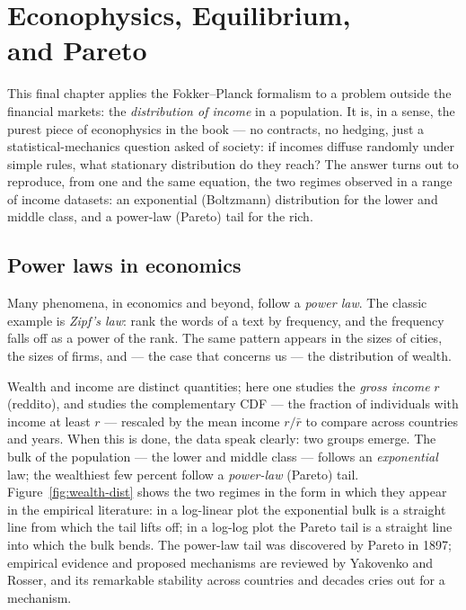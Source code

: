 
\chapter[Econophysics, Equilibrium, and Pareto]
{Econophysics, Equilibrium,\\and Pareto}

This final chapter applies the Fokker--Planck formalism to a problem outside the financial markets: the \emph{distribution of income} in a population.
It is, in a sense, the purest piece of econophysics in the book --- no contracts, no hedging, just a statistical-mechanics question asked of society: if incomes diffuse randomly under simple rules, what stationary distribution do they reach?
The answer turns out to reproduce, from one and the same equation, the two regimes observed in a range of income datasets: an exponential (Boltzmann) distribution for the lower and middle class, and a power-law (Pareto) tail for the rich.


\section{Power laws in economics}

Many phenomena, in economics and beyond, follow a \emph{power law}.
The classic example is \emph{Zipf's law}: rank the words of a text by frequency, and the frequency falls off as a power of the rank.
The same pattern appears in the sizes of cities, the sizes of firms, and --- the case that concerns us --- the distribution of wealth.

Wealth and income are distinct quantities; here one studies the \emph{gross income} $r$ (reddito), and studies the complementary CDF --- the fraction of individuals with income at least $r$ --- rescaled by the mean income $r/\bar r$ to compare across countries and years.
When this is done, the data speak clearly: two groups emerge.
The bulk of the population --- the lower and middle class --- follows an \emph{exponential} law; the wealthiest few percent follow a \emph{power-law} (Pareto) tail.
Figure~\ref{fig:wealth-dist} shows the two regimes in the form in which they appear in the empirical literature: in a log-linear plot the exponential bulk is a straight line from which the tail lifts off; in a log-log plot the Pareto tail is a straight line into which the bulk bends.
The power-law tail was discovered by Pareto in 1897\cite{Pareto1897}; empirical evidence and proposed mechanisms are reviewed by Yakovenko and Rosser\cite{Yakovenko2009}, and its remarkable stability across countries and decades cries out for a mechanism.

